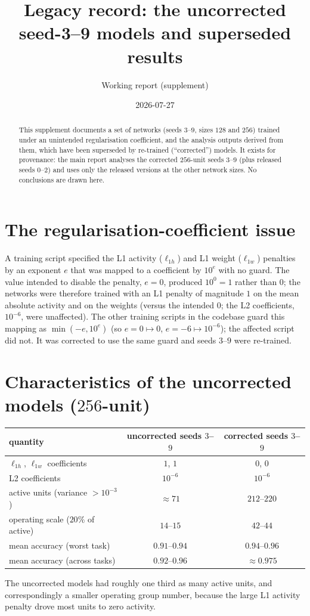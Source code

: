 \documentclass[11pt]{article}
\title{Legacy record: the uncorrected seed-3--9 models and superseded results}
\author{Working report (supplement)}
\date{2026-07-27}
\begin{document}
\maketitle

\begin{abstract}
This supplement documents a set of networks (seeds $3$--$9$, sizes $128$ and $256$) trained
under an unintended regularisation coefficient, and the analysis outputs derived from them,
which have been superseded by re-trained (``corrected'') models. It exists for provenance:
the main report analyses the corrected $256$-unit seeds $3$--$9$ (plus released seeds $0$--$2$)
and uses only the released versions at the other network sizes. No conclusions are drawn here.
\end{abstract}

\section{The regularisation-coefficient issue}
A training script specified the L1 activity ($\ell_{1h}$) and L1 weight ($\ell_{1w}$) penalties
by an exponent $e$ that was mapped to a coefficient by $10^{e}$ with no guard. The value
intended to disable the penalty, $e=0$, produced $10^{0}=1$ rather than $0$; the networks were
therefore trained with an L1 penalty of magnitude $1$ on the mean absolute activity and on the
weights (versus the intended $0$; the L2 coefficients, $10^{-6}$, were unaffected). The other
training scripts in the codebase guard this mapping as $\min(-e,10^{e})$ (so $e=0\mapsto0$,
$e=-6\mapsto10^{-6}$); the affected script did not. It was corrected to use the same guard and
seeds $3$--$9$ were re-trained.

\section{Characteristics of the uncorrected models ($256$-unit)}
\begin{center}
\begin{tabular}{lcc}
\toprule
quantity & uncorrected seeds $3$--$9$ & corrected seeds $3$--$9$ \\
\midrule
$\ell_{1h}$, $\ell_{1w}$ coefficients      & $1$, $1$                & $0$, $0$ \\
L2 coefficients                            & $10^{-6}$               & $10^{-6}$ \\
active units (variance $>10^{-3}$)         & $\approx 71$            & $212$--$220$ \\
operating scale ($20\%$ of active)         & $14$--$15$              & $42$--$44$ \\
mean accuracy (worst task)                 & $0.91$--$0.94$          & $0.94$--$0.96$ \\
mean accuracy (across tasks)               & $0.92$--$0.96$          & $\approx 0.975$ \\
\bottomrule
\end{tabular}
\end{center}
The uncorrected models had roughly one third as many active units, and correspondingly a
smaller operating group number, because the large L1 activity penalty drove most units to zero
activity.
\end{document}
